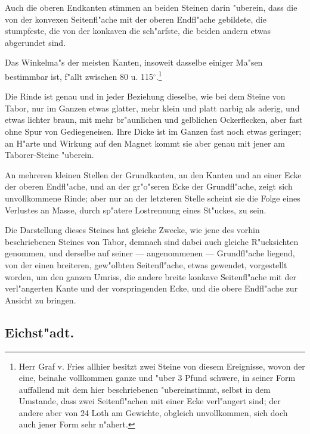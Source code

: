 \documentclass[a4paper, 11pt, oneside, german]{article}
\begin{document}
Auch die oberen Endkanten stimmen an beiden Steinen darin "uberein, dass die von der konvexen Seitenfl"ache mit der oberen Endfl"ache gebildete, die stumpfeste, die von der konkaven die sch"arfste, die beiden andern etwas abgerundet sind.

Das Winkelma"s der meisten Kanten, insoweit dasselbe einiger Ma"sen bestimmbar ist, f"allt zwischen 80 u. 115$^{\circ}$.\footnote{Herr Graf v. Fries allhier besitzt zwei Steine von diesem Ereignisse, wovon der eine, beinahe vollkommen ganze und "uber 3 Pfund schwere, in seiner Form auffallend mit dem hier beschriebenen "ubereinstimmt, selbst in dem Umstande, dass zwei Seitenfl"achen mit einer Ecke verl"angert sind; der andere aber von 24 Loth am Gewichte, obgleich unvollkommen, sich doch auch jener Form sehr n"ahert.}

Die Rinde ist genau und in jeder Beziehung dieselbe, wie bei dem Steine von Tabor, nur im Ganzen etwas glatter, mehr klein und platt narbig als aderig, und etwas lichter braun, mit mehr br"aunlichen und gelblichen Ockerflecken, aber fast ohne Spur von Gediegeneisen. Ihre Dicke ist im Ganzen fast noch etwas geringer; an H"arte und Wirkung auf den Magnet kommt sie aber genau mit jener am Taborer-Steine "uberein.

An mehreren kleinen Stellen der Grundkanten, an den Kanten und an einer Ecke der oberen Endfl"ache, und an der gr"o"seren Ecke der Grundfl"ache, zeigt sich unvollkommene Rinde; aber nur an der letzteren Stelle scheint sie die Folge eines Verlustes an Masse, durch sp"atere Lostrennung eines St"uckes, zu sein.

Die Darstellung dieses Steines hat gleiche Zwecke, wie jene des vorhin beschriebenen Steines von Tabor, demnach sind dabei auch gleiche R"ucksichten genommen, und derselbe auf seiner --- angenommenen --- Grundfl"ache liegend, von der einen breiteren, gew"olbten Seitenfl"ache, etwas gewendet, vorgestellt worden, um den ganzen Umriss, die andere breite konkave Seitenfl"ache mit der verl"angerten Kante und der vorspringenden Ecke, und die obere Endfl"ache zur Ansicht zu bringen.

\subsection{Eichst"adt.}
\end{document}
